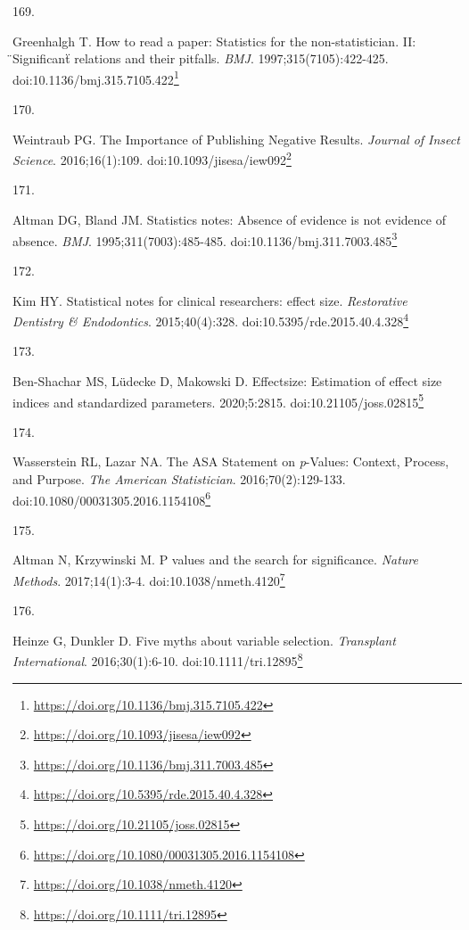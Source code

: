 \documentclass[
  a4paper,
]{book}
\newlength{\cslhangindent}
\newlength{\csllabelwidth}
\newlength{\cslentryspacingunit} %
\newenvironment{CSLReferences}[2] %
 {%
  \setlength{\parindent}{0pt}
  \ifodd #1
  \let\oldpar\par
  \def\par{\hangindent=\cslhangindent\oldpar}
  \fi
  \setlength{\parskip}{#2\cslentryspacingunit}
 }%
 {}
\newcommand{\CSLLeftMargin}[1]{\parbox[t]{\csllabelwidth}{#1}}
\newcommand{\CSLRightInline}[1]{\parbox[t]{\linewidth - \csllabelwidth}{#1}\break}
\renewcommand{\href}[2]{#2\footnote{\url{#1}}}
\begin{document}
\begin{CSLReferences}{0}{0}
\leavevmode{}%
\CSLLeftMargin{169. }%
\CSLRightInline{Greenhalgh T. How to read a paper: Statistics for the non-statistician. II: {̈}Significant{̈} relations and their pitfalls. \emph{BMJ}. 1997;315(7105):422-425. doi:\href{https://doi.org/10.1136/bmj.315.7105.422}{10.1136/bmj.315.7105.422}}

\leavevmode{}%
\CSLLeftMargin{170. }%
\CSLRightInline{Weintraub PG. The Importance of Publishing Negative Results. \emph{Journal of Insect Science}. 2016;16(1):109. doi:\href{https://doi.org/10.1093/jisesa/iew092}{10.1093/jisesa/iew092}}

\leavevmode{}%
\CSLLeftMargin{171. }%
\CSLRightInline{Altman DG, Bland JM. Statistics notes: Absence of evidence is not evidence of absence. \emph{BMJ}. 1995;311(7003):485-485. doi:\href{https://doi.org/10.1136/bmj.311.7003.485}{10.1136/bmj.311.7003.485}}

\leavevmode{}%
\CSLLeftMargin{172. }%
\CSLRightInline{Kim HY. Statistical notes for clinical researchers: effect size. \emph{Restorative Dentistry \& Endodontics}. 2015;40(4):328. doi:\href{https://doi.org/10.5395/rde.2015.40.4.328}{10.5395/rde.2015.40.4.328}}

\leavevmode{}%
\CSLLeftMargin{173. }%
\CSLRightInline{Ben-Shachar MS, Lüdecke D, Makowski D. {\textbraceleft}E{\textbraceright}ffectsize: Estimation of effect size indices and standardized parameters. 2020;5:2815. doi:\href{https://doi.org/10.21105/joss.02815}{10.21105/joss.02815}}

\leavevmode{}%
\CSLLeftMargin{174. }%
\CSLRightInline{Wasserstein RL, Lazar NA. The ASA Statement on {\emph{p}}-Values: Context, Process, and Purpose. \emph{The American Statistician}. 2016;70(2):129-133. doi:\href{https://doi.org/10.1080/00031305.2016.1154108}{10.1080/00031305.2016.1154108}}

\leavevmode{}%
\CSLLeftMargin{175. }%
\CSLRightInline{Altman N, Krzywinski M. P values and the search for significance. \emph{Nature Methods}. 2017;14(1):3-4. doi:\href{https://doi.org/10.1038/nmeth.4120}{10.1038/nmeth.4120}}

\leavevmode{}%
\CSLLeftMargin{176. }%
\CSLRightInline{Heinze G, Dunkler D. Five myths about variable selection. \emph{Transplant International}. 2016;30(1):6-10. doi:\href{https://doi.org/10.1111/tri.12895}{10.1111/tri.12895}}


\end{CSLReferences}
\end{document}
